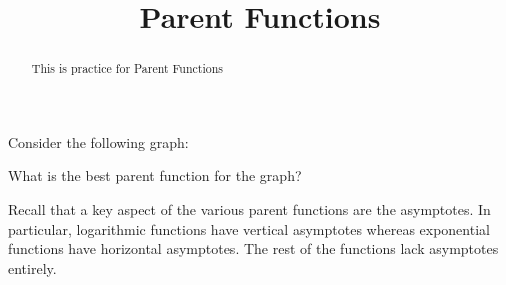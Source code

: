 \documentclass{ximera}
\title{Parent Functions}
\begin{document}
\begin{abstract}
    This is practice for Parent Functions
\end{abstract}
\maketitle



\begin{problem}%
    Consider the following graph:
    \begin{center}
    \end{center}
    
    What is the best parent function for the graph?
    
    \begin{multipleChoice}
    \end{multipleChoice}
    
    \begin{feedback}
        Recall that a key aspect of the various parent functions are the asymptotes. In particular, logarithmic functions have vertical asymptotes whereas exponential functions have horizontal asymptotes. The rest of the functions lack asymptotes entirely.
    \end{feedback}
    
\end{problem}
        
\end{document}
